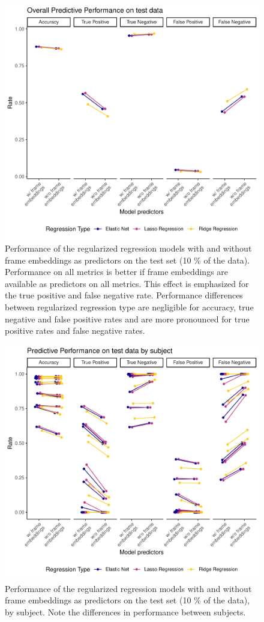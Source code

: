 \documentclass[
  man,floatsintext]{apa6}
\begin{document}
\begin{figure}
\includegraphics[width=0.95\linewidth]{FinalReport_files/figure-latex/fit-overall-1} \caption{Performance of the regularized regression models with and without frame embeddings as predictors on the test set (10 \% of the data). Performance on all metrics is better if frame embeddings are available as predictors on all metrics. This effect is emphasized for the true positive and false negative rate. Performance differences between regularized regression type are negligible for accuracy, true negative and false positive rates and are more pronounced for true positive rates and false negative rates.}\label{fig:fit-overall}
\end{figure}

\begin{figure}
\includegraphics[width=0.95\linewidth]{FinalReport_files/figure-latex/fit-ID-1} \caption{Performance of the regularized regression models with and without frame embeddings as predictors on the test set (10 \% of the data), by subject. Note the differences in performance between subjects.}\label{fig:fit-ID}
\end{figure}
\end{document}
